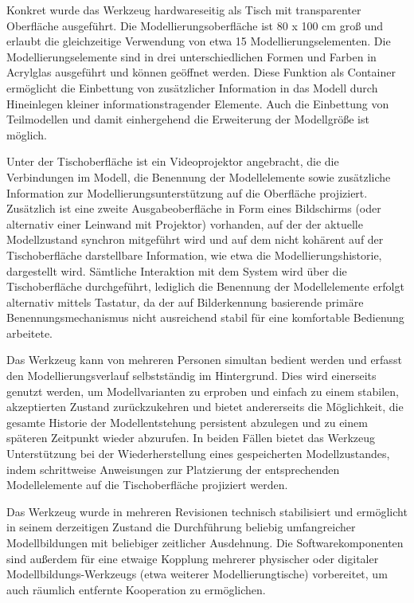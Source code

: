 Konkret wurde das Werkzeug hardwareseitig als Tisch mit transparenter Oberfläche ausgeführt. Die Modellierungsoberfläche ist 80 x 100 cm groß und erlaubt die gleichzeitige Verwendung von etwa 15 Modellierungselementen. Die Modellierungselemente sind in drei unterschiedlichen Formen und Farben in Acrylglas ausgeführt und können geöffnet werden. Diese Funktion als Container ermöglicht die Einbettung von zusätzlicher Information in das Modell durch Hineinlegen kleiner informationstragender Elemente. Auch die Einbettung von Teilmodellen und damit einhergehend die Erweiterung der Modellgröße ist möglich. 

Unter der Tischoberfläche ist ein Videoprojektor angebracht, die die Verbindungen im Modell, die Benennung der Modellelemente sowie zusätzliche Information zur Modellierungsunterstützung auf die Oberfläche projiziert. Zusätzlich ist eine zweite Ausgabeoberfläche in Form eines Bildschirms (oder alternativ einer Leinwand mit Projektor) vorhanden, auf der der aktuelle Modellzustand synchron mitgeführt wird und auf dem nicht kohärent auf der Tischoberfläche darstellbare Information, wie etwa die Modellierungshistorie, dargestellt wird. Sämtliche Interaktion mit dem System wird über die Tischoberfläche durchgeführt, lediglich die Benennung der Modellelemente erfolgt alternativ mittels Tastatur, da der auf Bilderkennung basierende primäre Benennungsmechanismus nicht ausreichend stabil für eine komfortable Bedienung arbeitete.

Das Werkzeug kann von mehreren Personen simultan bedient werden und erfasst den Modellierungsverlauf selbstständig im Hintergrund. Dies wird einerseits genutzt werden, um Modellvarianten zu erproben und einfach zu einem stabilen, akzeptierten Zustand zurückzukehren und bietet andererseits die Möglichkeit, die gesamte Historie der Modellentstehung persistent abzulegen und zu einem späteren Zeitpunkt wieder abzurufen. In beiden Fällen bietet das Werkzeug Unterstützung bei der Wiederherstellung eines gespeicherten Modellzustandes, indem schrittweise Anweisungen zur Platzierung der entsprechenden Modellelemente auf die Tischoberfläche projiziert werden.

Das Werkzeug wurde in mehreren Revisionen technisch stabilisiert und ermöglicht in seinem derzeitigen Zustand die Durchführung beliebig umfangreicher Modellbildungen mit beliebiger zeitlicher Ausdehnung. Die Softwarekomponenten sind außerdem für eine etwaige Kopplung mehrerer physischer oder digitaler Modellbildungs-Werkzeugs (etwa weiterer Modellierungtische) vorbereitet, um auch räumlich entfernte Kooperation zu ermöglichen. 

